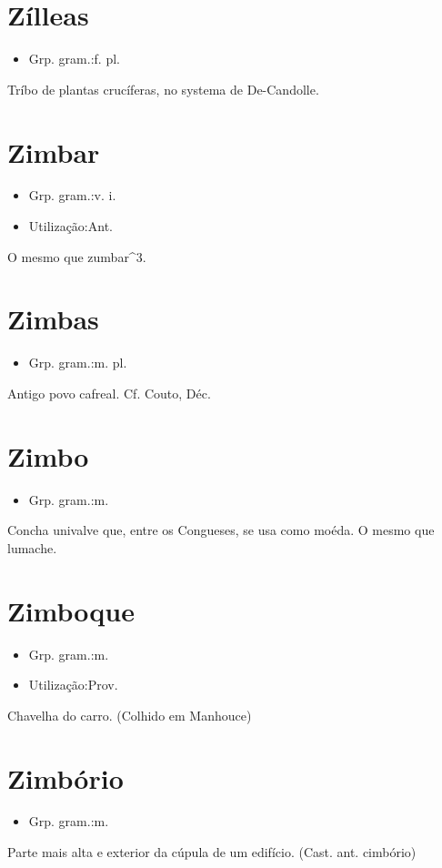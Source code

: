 \section{Zílleas}
\begin{itemize}
\item {Grp. gram.:f. pl.}
\end{itemize}
Tríbo de plantas crucíferas, no systema de De-Candolle.
\section{Zimbar}
\begin{itemize}
\item {Grp. gram.:v. i.}
\end{itemize}
\begin{itemize}
\item {Utilização:Ant.}
\end{itemize}
O mesmo que \textunderscore zumbar\textunderscore ^3.
\section{Zimbas}
\begin{itemize}
\item {Grp. gram.:m. pl.}
\end{itemize}
Antigo povo cafreal. Cf. Couto, \textunderscore Déc.\textunderscore 
\section{Zimbo}
\begin{itemize}
\item {Grp. gram.:m.}
\end{itemize}
Concha univalve que, entre os Congueses, se usa como moéda.
O mesmo que \textunderscore lumache\textunderscore .
\section{Zimboque}
\begin{itemize}
\item {Grp. gram.:m.}
\end{itemize}
\begin{itemize}
\item {Utilização:Prov.}
\end{itemize}
Chavelha do carro. (Colhido em Manhouce)
\section{Zimbório}
\begin{itemize}
\item {Grp. gram.:m.}
\end{itemize}
Parte mais alta e exterior da cúpula de um edifício.
(Cast. ant. \textunderscore cimbório\textunderscore )
